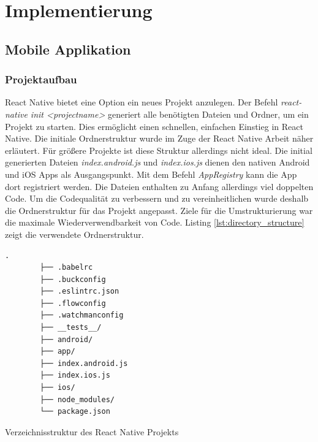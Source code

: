 \section{Implementierung}
        
    \subsection{Mobile Applikation}
        
            \subsubsection{Projektaufbau}
        React Native bietet eine Option ein neues Projekt anzulegen. Der Befehl \textit{react-native init <projectname>} generiert alle benötigten Dateien und Ordner, um ein Projekt zu starten. Dies ermöglicht einen schnellen, einfachen Einstieg in React Native. Die initiale Ordnerstruktur wurde im Zuge der React Native Arbeit näher erläutert. Für größere Projekte ist diese Struktur allerdings nicht ideal. Die initial generierten Dateien \textit{index.android.js} und \textit{index.ios.js} dienen den nativen Android und iOS Apps als Ausgangspunkt. Mit dem Befehl \textit{AppRegistry} kann die App dort registriert werden. Die Dateien enthalten zu Anfang allerdings viel doppelten Code. Um die Codequalität zu verbessern und zu vereinheitlichen wurde deshalb die Ordnerstruktur für das Projekt angepasst. Ziele für die Umstrukturierung war die maximale Wiederverwendbarkeit von Code. Listing \ref{lst:directory_structure} zeigt die verwendete Ordnerstruktur.
        
        
        \begin{lstlisting}[style=tree]
        .
        ├── .babelrc
        ├── .buckconfig
        ├── .eslintrc.json
        ├── .flowconfig
        ├── .watchmanconfig
        ├── __tests__/
        ├── android/
        ├── app/
        ├── index.android.js
        ├── index.ios.js
        ├── ios/
        ├── node_modules/
        └── package.json
        \end{lstlisting}
        \vspace{-0.5 cm}
        \begin{listing}[H]
            \caption{Verzeichnisstruktur des React Native Projekts}
            \label{lst:directory_structure}
        \end{listing}
        
